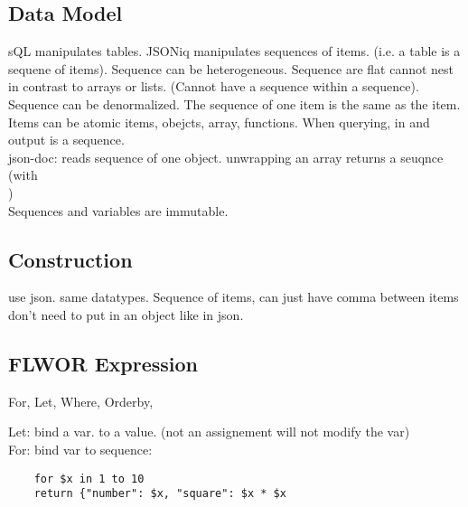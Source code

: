 \subsection{Data Model}
sQL manipulates tables. JSONiq manipulates sequences of items. (i.e. a table is a sequene of items).
Sequence can be heterogeneous. Sequence are flat cannot nest in contrast to arrays or lists. (Cannot have a sequence within a sequence).
Sequence can be denormalized. The sequence of one item is the same as the item.
Items can be atomic items, obejcts, array, functions.
When querying, in and output is a sequence. \\
json-doc: reads sequence of one object.
unwrapping an array returns a seuqnce (with \[\]) \\
Sequences and variables are immutable.

\subsection{Construction}
use json. same datatypes. Sequence of items, can just have comma between items don't need to put in an object like in json.


\subsection{FLWOR Expression}

For, Let, Where, Orderby,

Let: bind a var. to a value. (not an assignement will not modify the var) \\
For: bind var to sequence:
\begin{lstlisting}
    for $x in 1 to 10
    return {"number": $x, "square": $x * $x
\end{lstlisting}


